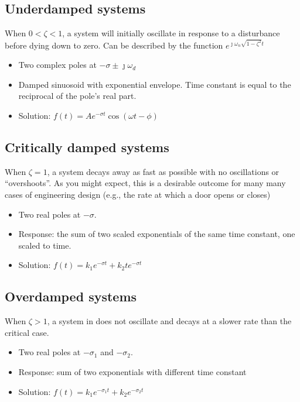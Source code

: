 \documentclass[11pt]{book}
\begin{document}
\subsection{Underdamped systems}
When $0< \zeta < 1$, a system  will initially oscillate in response to a disturbance before dying down to zero. Can be described by the function $e^{\jmath\omega_n\sqrt{1-\zeta^2}t}$ 

\begin{itemize}
	\item Two complex poles at $-\sigma \pm \jmath \omega_d$ 
	\item Damped sinuosoid with exponential envelope. Time constant is equal to the reciprocal of the pole's real part. 
	\item Solution: $f(t) = Ae^{-\sigma t}\cos (\omega t - \phi)$
\end{itemize} 

\subsection{Critically damped systems}
When $\zeta = 1$, a system  decays away as fast as possible with no oscillations or ``overshoots''. As you might expect, this is a desirable outcome for many many cases of engineering design (e.g., the rate at which a door opens or closes) 
\begin{itemize}
	\item Two real poles at $-\sigma$. 
	\item Response: the sum of two scaled exponentials of the same time constant, one scaled to time. 
	\item Solution: $f(t) = k_1e^{-\sigma t} + k_2te^{-\sigma t}$
\end{itemize}

\subsection{Overdamped systems}
When $\zeta > 1$, a system in does not oscillate and decays  at a slower rate than the critical case. 
\begin{itemize}
	\item Two real poles at $-\sigma_1$ and $-\sigma_2$. 
	\item Response: sum of two exponentials with different time constant
	\item Solution: $f(t) = k_1e^{-\sigma_1 t} + k_2 e^{-\sigma_2 t}$
\end{itemize}
\end{document}
